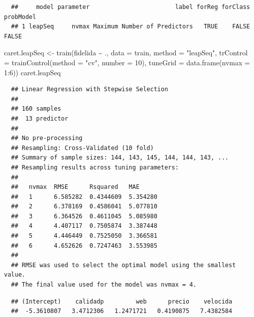 \documentclass[
]{book}
\newenvironment{Shaded}{\begin{snugshade}}{\end{snugshade}}
\newcommand{\AttributeTok}[1]{\textcolor[rgb]{0.77,0.63,0.00}{#1}}
\newcommand{\CommentTok}[1]{\textcolor[rgb]{0.56,0.35,0.01}{\textit{#1}}}
\newcommand{\DecValTok}[1]{\textcolor[rgb]{0.00,0.00,0.81}{#1}}
\newcommand{\FunctionTok}[1]{\textcolor[rgb]{0.00,0.00,0.00}{#1}}
\newcommand{\NormalTok}[1]{#1}
\newcommand{\OtherTok}[1]{\textcolor[rgb]{0.56,0.35,0.01}{#1}}
\newcommand{\SpecialCharTok}[1]{\textcolor[rgb]{0.00,0.00,0.00}{#1}}
\newcommand{\StringTok}[1]{\textcolor[rgb]{0.31,0.60,0.02}{#1}}
\theoremstyle{break}
\theoremstyle{nonumberplain}
\renewcommand{\CommentTok}[1]{\textcolor[rgb]{0.41,0.41,0.41}{\texttt{#1}}}
\begin{document}
\begin{verbatim}
  ##     model parameter                        label forReg forClass probModel
  ## 1 leapSeq     nvmax Maximum Number of Predictors   TRUE    FALSE     FALSE
\end{verbatim}

\begin{Shaded}
\begin{Highlighting}[]
\NormalTok{caret.leapSeq }\OtherTok{\textless{}{-}} \FunctionTok{train}\NormalTok{(fidelida }\SpecialCharTok{\textasciitilde{}}\NormalTok{ ., }\AttributeTok{data =}\NormalTok{ train, }\AttributeTok{method =} \StringTok{"leapSeq"}\NormalTok{,}
                   \AttributeTok{trControl =} \FunctionTok{trainControl}\NormalTok{(}\AttributeTok{method =} \StringTok{"cv"}\NormalTok{, }\AttributeTok{number =} \DecValTok{10}\NormalTok{),}
                   \AttributeTok{tuneGrid =} \FunctionTok{data.frame}\NormalTok{(}\AttributeTok{nvmax =} \DecValTok{1}\SpecialCharTok{:}\DecValTok{6}\NormalTok{))}
\NormalTok{caret.leapSeq}
\end{Highlighting}
\end{Shaded}

\begin{verbatim}
  ## Linear Regression with Stepwise Selection 
  ## 
  ## 160 samples
  ##  13 predictor
  ## 
  ## No pre-processing
  ## Resampling: Cross-Validated (10 fold) 
  ## Summary of sample sizes: 144, 143, 145, 144, 144, 143, ... 
  ## Resampling results across tuning parameters:
  ## 
  ##   nvmax  RMSE      Rsquared   MAE     
  ##   1      6.585282  0.4344609  5.354280
  ##   2      6.378169  0.4586041  5.077810
  ##   3      6.364526  0.4611045  5.085980
  ##   4      4.407117  0.7505874  3.387448
  ##   5      4.446449  0.7525050  3.366581
  ##   6      4.652626  0.7247463  3.553985
  ## 
  ## RMSE was used to select the optimal model using the smallest value.
  ## The final value used for the model was nvmax = 4.
\end{verbatim}

\begin{Shaded}
\end{Shaded}

\begin{verbatim}
  ## (Intercept)    calidadp         web      precio    velocida 
  ##  -5.3610807   3.4712306   1.2471721   0.4190875   7.4382584
\end{verbatim}
\end{document}
